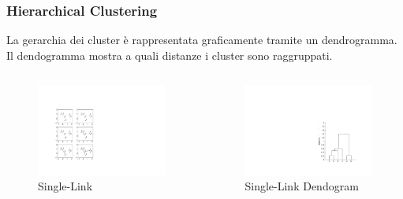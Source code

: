 \begin{frame}

	\frametitle{{\color{GradientDescentDiagramGreen}Hierarchical Clustering}}


		La gerarchia dei cluster è rappresentata graficamente tramite un dendrogramma.\\
		Il dendogramma mostra a quali distanze i cluster sono raggruppati.

		\begin{columns}

			\begin{figure}[!htbp]
				\centering
				\includegraphics[angle=0,width=0.50\linewidth]{images/unsupervised/hierarchical/hierarchical_single_link.pdf}
				\caption{Single-Link}
			\end{figure}

			\begin{figure}[!htbp]
				\centering
				\includegraphics[angle=0,width=0.65\linewidth]{images/unsupervised/hierarchical/hierarchical_single_link_dendogram.pdf}
				\caption{Single-Link Dendogram}
			\end{figure}

		\end{columns}


\end{frame}




